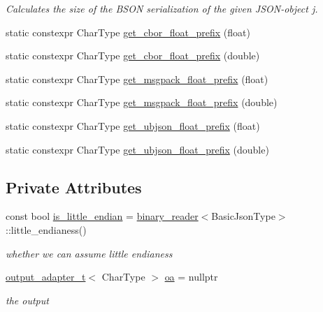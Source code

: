 \begin{DoxyCompactItemize}
\begin{DoxyCompactList}\small\item\em Calculates the size of the B\+S\+ON serialization of the given J\+S\+O\+N-\/object {\itshape j}. \end{DoxyCompactList}\item 
static constexpr Char\+Type \mbox{\hyperlink{classnlohmann_1_1detail_1_1binary__writer_a2b5cb010077da6241a18bb334736464c}{get\+\_\+cbor\+\_\+float\+\_\+prefix}} (float)
\item 
static constexpr Char\+Type \mbox{\hyperlink{classnlohmann_1_1detail_1_1binary__writer_afe5ac43e05973ba09ee79227bb589b59}{get\+\_\+cbor\+\_\+float\+\_\+prefix}} (double)
\item 
static constexpr Char\+Type \mbox{\hyperlink{classnlohmann_1_1detail_1_1binary__writer_ad452d114696407b98abc69b6001c270e}{get\+\_\+msgpack\+\_\+float\+\_\+prefix}} (float)
\item 
static constexpr Char\+Type \mbox{\hyperlink{classnlohmann_1_1detail_1_1binary__writer_a47234a6e7ac9206d43553985f4cacbf2}{get\+\_\+msgpack\+\_\+float\+\_\+prefix}} (double)
\item 
static constexpr Char\+Type \mbox{\hyperlink{classnlohmann_1_1detail_1_1binary__writer_a6837b20574152f7f645d0f6cd9fafdeb}{get\+\_\+ubjson\+\_\+float\+\_\+prefix}} (float)
\item 
static constexpr Char\+Type \mbox{\hyperlink{classnlohmann_1_1detail_1_1binary__writer_a19eb47a53dbbe28f319532bef25d84e6}{get\+\_\+ubjson\+\_\+float\+\_\+prefix}} (double)
\end{DoxyCompactItemize}
\subsection*{Private Attributes}
\begin{DoxyCompactItemize}
\item 
const bool \mbox{\hyperlink{classnlohmann_1_1detail_1_1binary__writer_a048887c907afe39759b777e8c888414c}{is\+\_\+little\+\_\+endian}} = \mbox{\hyperlink{classnlohmann_1_1detail_1_1binary__reader}{binary\+\_\+reader}}$<$Basic\+Json\+Type$>$\+::little\+\_\+endianess()
\begin{DoxyCompactList}\small\item\em whether we can assume little endianess \end{DoxyCompactList}\item 
\mbox{\hyperlink{namespacenlohmann_1_1detail_a9b680ddfb58f27eb53a67229447fc556}{output\+\_\+adapter\+\_\+t}}$<$ Char\+Type $>$ \mbox{\hyperlink{classnlohmann_1_1detail_1_1binary__writer_a6f15b782a7900f50ef37d123008e601b}{oa}} = nullptr
\begin{DoxyCompactList}\small\item\em the output \end{DoxyCompactList}\end{DoxyCompactItemize}


